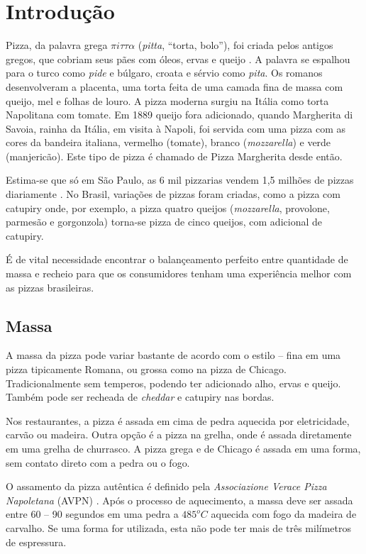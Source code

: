 \section{Introdução}

Pizza, da palavra grega $\pi i \tau \tau \alpha$ (\textsl{pitta}, 
``torta, bolo''), foi criada pelos antigos gregos, que cobriam seus pães com 
óleos, ervas e 
queijo \cite{civitello2007cuisine}.  A palavra se espalhou para o
turco como \textsl{pide} e búlgaro, croata e sérvio como \textsl{pita}.
Os romanos desenvolveram a placenta, uma torta feita de uma camada fina de massa
com queijo, mel e folhas de louro.  A pizza moderna surgiu na Itália como
torta Napolitana com tomate.  Em 1889 queijo fora adicionado, quando
Margherita di Savoia, rainha da Itália, em visita à Napoli, foi servida
com uma pizza com as cores da bandeira italiana, vermelho (tomate), 
branco (\textsl{mozzarella}) e verde (manjericão).  Este tipo de pizza é 
chamado de Pizza Margherita desde então.

Estima-se que só em São Paulo, as 6 mil pizzarias vendem 1,5 milhões
de pizzas diariamente \cite{SPPizza}.  No Brasil, variações de pizzas foram
criadas, como a pizza com catupiry onde, por exemplo, a pizza 
quatro queijos
(\textsl{mozzarella}, provolone, parmesão e gorgonzola) torna-se pizza de
cinco queijos, com adicional de catupiry.

É de vital necessidade encontrar o balançeamento perfeito entre quantidade
de massa e recheio para que os consumidores tenham uma experiência melhor
com as pizzas brasileiras.

\subsection{Massa}

A massa da pizza pode variar bastante de acordo com o estilo -- fina em 
uma pizza tipicamente Romana, ou grossa como na pizza de Chicago.  
Tradicionalmente sem temperos, podendo ter adicionado alho, ervas e queijo.
Também pode ser recheada de \textsl{cheddar} e catupiry nas 
bordas.

Nos restaurantes, a pizza é assada em cima de pedra aquecida por 
eletricidade, carvão ou madeira.  Outra opção é a pizza na grelha, onde é
assada diretamente em uma grelha de churrasco.  A pizza grega e de Chicago
é assada em uma forma, sem contato direto com a pedra ou o fogo.

O assamento da pizza autêntica é definido pela \textsl{Associazione Verace 
Pizza Napoletana} (AVPN) \cite{AVPN}.
Após o processo de aquecimento, a massa deve 
ser assada entre 60 -- 90 segundos em uma pedra a $485^oC$ aquecida com fogo
da madeira de carvalho.  Se uma forma for utilizada, esta não pode ter mais de
três milímetros de espressura.

